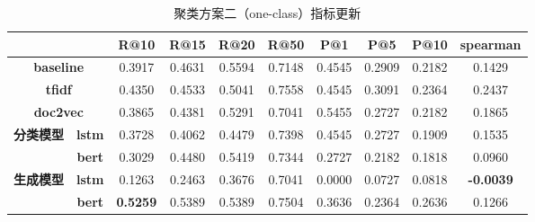 \documentclass[11pt]{article}
\begin{document}
\begin{CJK}{UTF8}{gkai}
\begin{table}[htbp]
  \centering
  \begin{tabular}{c|c|c|c|c|c|c|c|c|c}
    \hline
    \multicolumn{2}{c}{} & \textbf{R@10} & \textbf{R@15} & \textbf{R@20} & \textbf{R@50} & \textbf{P@1} & \textbf{P@5} & \textbf{P@10} & \textbf{spearman} \\
    \hline
    \multicolumn{2}{c}{\textbf{baseline}} & 0.3917  & 0.4631  & 0.5594  & 0.7148  & 0.4545  & 0.2909  & 0.2182  & 0.1429  \\
    \hline
    \multicolumn{2}{c}{\textbf{tfidf}} & 0.4350  & 0.4533  & 0.5041  & 0.7558  & 0.4545  & 0.3091  & 0.2364  & 0.2437  \\
    \hline
    \multicolumn{2}{c}{\textbf{doc2vec}} & 0.3865  & 0.4381  & 0.5291  & 0.7041  & 0.5455  & 0.2727  & 0.2182  & 0.1865  \\
    \hline
    \multirow{2}[0]{*}{\textbf{分类模型}} & \textbf{lstm} & 0.3728  & 0.4062  & 0.4479  & 0.7398  & 0.4545  & 0.2727  & 0.1909  & 0.1535  \\
    & \textbf{bert} & 0.3029  & 0.4480  & 0.5419  & 0.7344  & 0.2727  & 0.2182  & 0.1818  & 0.0960  \\
    \hline
    \multirow{2}[0]{*}{\textbf{生成模型}} & \textbf{lstm} & 0.1263  & 0.2463  & 0.3676  & 0.7041  & 0.0000  & 0.0727  & 0.0818  & \textcolor[rgb]{ 0,  .69,  .314}{\textbf{-0.0039 }} \\
    & \textbf{bert} & \textcolor[rgb]{ 1,  0,  0}{\textbf{0.5259 }} & 0.5389  & 0.5389  & 0.7504  & 0.3636  & 0.2364  & 0.2636  & 0.1266  \\
    \hline
  \end{tabular}%
  \caption{聚类方案二（one-class）指标更新}
  \label{tab:addlabel}%
\end{table}%



\end{CJK}
\end{document}
